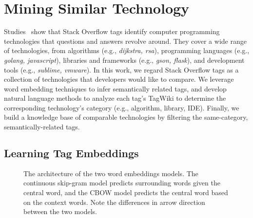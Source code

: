 \section{Mining Similar Technology}
\label{sec:similarTech}


Studies~\cite{barua2014developers, chen2016mining, treude2011programmers} show that Stack Overflow tags identify computer programming technologies that questions and answers revolve around. 
They cover a wide range of technologies, from algorithms (e.g.,  \textit{dijkstra, rsa}), programming languages (e.g., \textit{golang, javascript}), libraries and frameworks (e.g.,  \textit{gson, flask}), and development tools (e.g., \textit{sublime, vmware}). 
In this work, we regard Stack Overflow tags as a collection of technologies that developers would like to compare. 
We leverage word embedding techniques to infer semantically related tags, and develop natural language methods to analyze each tag's TagWiki to determine the corresponding technology's category (e.g., algorithm, library, IDE).
Finally, we build a knowledge base of comparable technologies by filtering the same-category, semantically-related tags. 

\subsection{Learning Tag Embeddings}
\label{sec:w2v}

\begin{figure}
	\centering
	\hfill
	\caption{The architecture of the two word embeddings models. The continuous skip-gram model predicts surrounding words given the central word, and the CBOW model predicts the central word based on the context words. Note the differences in arrow direction between the two models.
	}
	\vspace{-2mm}
	\label{fig:w2v}
\end{figure}

